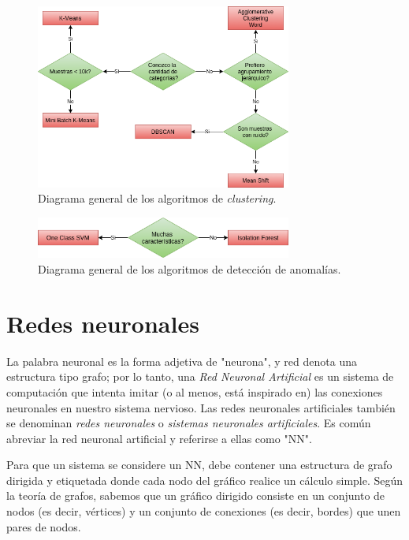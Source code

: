 \documentclass[a4paper,12pt]{article}
\begin{document}
\begin{figure}[H]
	\begin{center}				
		\includegraphics[width=0.75\textwidth]{clusteringdiagram.png}
		\caption{Diagrama general de los algoritmos de \textit{clustering}.}
		\label{fig:clusteringdiagram.}
	\end{center}
\end{figure}

\begin{figure}[H]
	\begin{center}				
		\includegraphics[width=0.75\textwidth]{anomalydiagram.png}
		\caption{Diagrama general de los algoritmos de detección de anomalías.}
		\label{fig:anomalydiagram.}
	\end{center}
\end{figure}

\clearpage

\section{Redes neuronales}
La palabra neuronal es la forma adjetiva de "neurona", y red denota una estructura tipo grafo; por lo tanto, una \textit{Red Neuronal Artificial} es un sistema de computación que intenta imitar (o al menos, está inspirado en) las conexiones neuronales en nuestro sistema nervioso. Las redes neuronales artificiales también se denominan \textit{redes neuronales} o \textit{sistemas neuronales artificiales}. Es común abreviar la red neuronal artificial y referirse a ellas como "NN". \citep{rosebrock2017deep}

Para que un sistema se considere un NN, debe contener una estructura de grafo dirigida y etiquetada donde cada nodo del gráfico realice un cálculo simple. Según la teoría de grafos, sabemos que un gráfico dirigido consiste en un conjunto de nodos (es decir, vértices) y un conjunto de conexiones (es decir, bordes) que unen pares de nodos.
\end{document}
